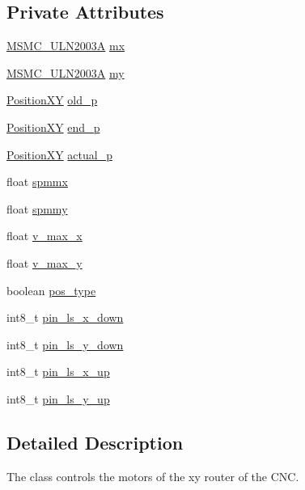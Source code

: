 \subsection*{Private Attributes}
\begin{DoxyCompactItemize}
\item 
\hyperlink{class_m_s_m_c___u_l_n2003_a}{M\+S\+M\+C\+\_\+\+U\+L\+N2003\+A} \hyperlink{class_c_n_cxy_a82c1a00846aa58fd6418f5b2ee0461bf}{mx}
\item 
\hyperlink{class_m_s_m_c___u_l_n2003_a}{M\+S\+M\+C\+\_\+\+U\+L\+N2003\+A} \hyperlink{class_c_n_cxy_ab8a50121a78a388da72fb7afa7976ab6}{my}
\item 
\hyperlink{class_position_x_y}{Position\+X\+Y} \hyperlink{class_c_n_cxy_aeb098f15e8a8b543000d9ef37e9feef9}{old\+\_\+p}
\item 
\hyperlink{class_position_x_y}{Position\+X\+Y} \hyperlink{class_c_n_cxy_a05e392fc9ee4a988a572d19e14b72cb6}{end\+\_\+p}
\item 
\hyperlink{class_position_x_y}{Position\+X\+Y} \hyperlink{class_c_n_cxy_ae9fd8205dff0ba54bb540d3c087f3648}{actual\+\_\+p}
\item 
float \hyperlink{class_c_n_cxy_a3707e01e2d9c655ceb51e6cb92f07bc4}{spmmx}
\item 
float \hyperlink{class_c_n_cxy_a3bdb499bf61a7b3de964626d54e842e5}{spmmy}
\item 
float \hyperlink{class_c_n_cxy_a35226c5b9864068017c23c0d587baf6c}{v\+\_\+max\+\_\+x}
\item 
float \hyperlink{class_c_n_cxy_a90f4339997565bd4e336fbfe48496c92}{v\+\_\+max\+\_\+y}
\item 
boolean \hyperlink{class_c_n_cxy_a045b5a37ac46c097865761673da78784}{pos\+\_\+type}
\item 
int8\+\_\+t \hyperlink{class_c_n_cxy_ab1530ea424cc465cecb4c01319a550c5}{pin\+\_\+ls\+\_\+x\+\_\+down}
\item 
int8\+\_\+t \hyperlink{class_c_n_cxy_aef36e34352e9bc09b73f2de9e79fc2d8}{pin\+\_\+ls\+\_\+y\+\_\+down}
\item 
int8\+\_\+t \hyperlink{class_c_n_cxy_aa54d319ebcd5aae9ff29dde28c6861ba}{pin\+\_\+ls\+\_\+x\+\_\+up}
\item 
int8\+\_\+t \hyperlink{class_c_n_cxy_a95ad093d8baf86a612deba248f1e1226}{pin\+\_\+ls\+\_\+y\+\_\+up}
\end{DoxyCompactItemize}


\subsection{Detailed Description}
The class controls the motors of the xy router of the C\+N\+C. 

